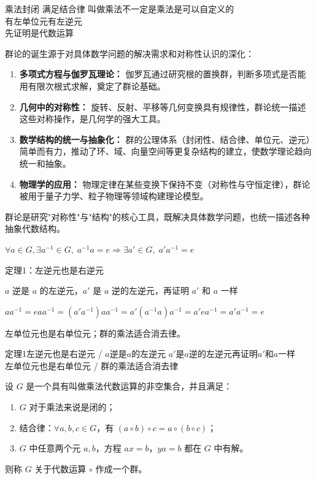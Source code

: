 \begin{note}[群的定义]
乘法封闭 满足结合律 叫做乘法不一定是乘法是可以自定义的 \\
有左单位元有左逆元 \\
先证明是代数运算
\end{note}

\begin{note}[群的意义]
群论的诞生源于对具体数学问题的解决需求和对称性认识的深化：
\begin{enumerate}
  \item \textbf{多项式方程与伽罗瓦理论：} 伽罗瓦通过研究根的置换群，判断多项式是否能用有限次根式求解，奠定了群论基础。
  \item \textbf{几何中的对称性：} 旋转、反射、平移等几何变换具有规律性，群论统一描述这些对称操作，是几何学的强大工具。
  \item \textbf{数学结构的统一与抽象化：} 群的公理体系（封闭性、结合律、单位元、逆元）简单而有力，推动了环、域、向量空间等更复杂结构的建立，使数学理论趋向统一和抽象。
  \item \textbf{物理学的应用：} 物理定律在某些变换下保持不变（对称性与守恒定律），群论被用于量子力学、粒子物理等领域构建理论模型。
\end{enumerate}
群论是研究"对称性"与"结构"的核心工具，既解决具体数学问题，也统一描述各种抽象代数结构。
\end{note}

\begin{note}[群的性质]
$\forall a\in G,\exists a^{-1}\in G,\;a^{-1}a=e\Rightarrow\exists a'\in G,\;a'a^{-1}=e$

定理1：左逆元也是右逆元

$a$ 逆是 $a$ 的左逆元，$a'$ 是 $a$ 逆的左逆元，再证明 $a'$ 和 $a$ 一样

$aa^{-1}=eaa^{-1}=(a'a^{-1})aa^{-1}=a'(a^{-1}a)a^{-1}=a'ea^{-1}=a'a^{-1}=e$

左单位元也是右单位元；群的乘法适合消去律。

定理1左逆元也是右逆元 / $a$逆是$a$的左逆元 $a'$是$a$逆的左逆元再证明$a'$和$a$一样 \\
左单位元也是右单位元 / 群的乘法适合消去律
\end{note}

\begin{note}[群的等价判别]
设 $G$ 是一个具有叫做乘法代数运算的非空集合，并且满足：
\begin{enumerate}
  \item[I.] $G$ 对于乘法来说是闭的；
  \item[II.] 结合律：$\forall a,b,c\in G$，有 $(a\circ b)\circ c=a\circ(b\circ c)$；
  \item[III.] $G$ 中任意两个元 $a,b$，方程 $ax=b$，$ya=b$ 都在 $G$ 中有解。
\end{enumerate}
则称 $G$ 关于代数运算 $\circ$ 作成一个群。
\end{note}

